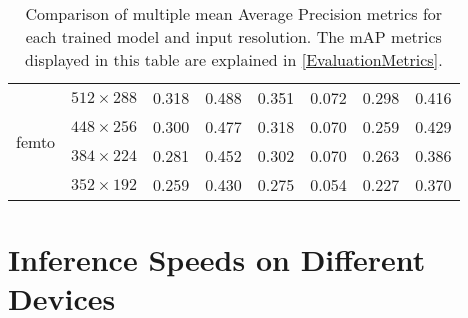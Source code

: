 \begin{table}
\begin{tabular}{|c|c|rrrrrr|}
        \hline
        \multirow{4}{*}{femto}       & \multirow{1}{*}{$512\times288$}  & 0.318 & 0.488 & 0.351 & 0.072 & 0.298 & 0.416 \\
        \cline{2-2}
                                     & \multirow{1}{*}{$448\times256$}  & 0.300 & 0.477 & 0.318 & 0.070 & 0.259 & 0.429 \\
        \cline{2-2}
                                     & \multirow{1}{*}{$384\times224$}  & 0.281 & 0.452 & 0.302 & 0.070 & 0.263 & 0.386 \\
        \cline{2-2}
                                     & \multirow{1}{*}{$352\times192$}  & 0.259 & 0.430 & 0.275 & 0.054 & 0.227 & 0.370 \\
        \hline
    \end{tabular}
    \caption{Comparison of multiple mean Average Precision metrics for each
    trained model and input resolution. The mAP metrics displayed in this table
    are explained in \autoref{EvaluationMetrics}.}
    \label{mAPTableSmall}
\end{table}






\section{Inference Speeds on Different Devices}



